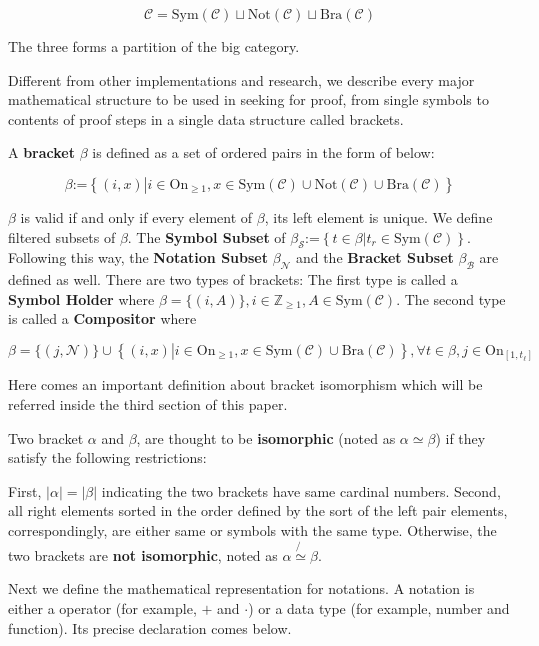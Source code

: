 \documentclass{article}
\begin{document}
\[\mathcal{C}=\text{Sym}(\mathcal{C})\sqcup \text{Not}(\mathcal{C})\sqcup \text{Bra}(\mathcal{C})\]

The three forms a partition of the big category.

Different from other implementations and research, we describe every major mathematical structure to be used in seeking for proof, from single symbols to contents of proof steps in a single data structure called brackets.

 A \textbf{ bracket} \(\beta\) is defined as a set of ordered pairs in the form of below:

\[\beta \text{:=}\left\{(i,x)\left|i\in \text{On}_{\geq 1}\right.,x\in \text{Sym}(\mathcal{C})\cup \text{Not}(\mathcal{C})\cup \text{Bra}(\mathcal{C})\right\}\]

\(\beta\) is valid if and only if every element of \(\beta\), its left element is unique. We define filtered subsets of \(\beta\). The \textbf{ Symbol Subset} of \(\beta _{\mathcal{S}}\text{:=}\left\{t\in \beta \left|t_{\mathit{r}}\in \text{Sym}(\mathcal{C})\right.\right\}\). Following this way, the \textbf{ Notation Subset} \(\beta _{\mathcal{N}}\) and the \textbf{ Bracket Subset} \(\beta _{\mathcal{B}}\) are defined as well. There are two types of brackets: The first type is called a \textbf{ Symbol Holder} where \(\beta =\{(i,A)\},i\in \mathbb{Z}_{\geq 1},A\in \text{Sym}(\mathcal{C})\). The second type is called a \textbf{ Compositor} where

\[\beta =\{(j,\mathcal{N})\}\cup \left\{(i,x)\left|i\in \text{On}_{\geq 1}\right., x\in \text{Sym}(\mathcal{C})\cup \text{Bra}(\mathcal{C})\right\},\forall
t\in \beta ,j\in \text{On}_{\left[1,t_{\ell }\right]}\]

Here comes an important definition about bracket isomorphism which will be referred inside the third section of this paper.

 Two bracket \(\alpha\) and \(\beta\), are thought to be \textbf{ isomorphic} (noted as \(\alpha \simeq \beta\)) if they satisfy the following restrictions:

First, \(|\alpha |=|\beta |\) indicating the two brackets have same cardinal numbers. Second, all right elements sorted in the order defined by the sort of the left pair elements, correspondingly, are either same or symbols with the same type. Otherwise, the two brackets are \textbf{ not isomorphic}, noted as \(\alpha \not{\simeq}\beta\).

Next we define the mathematical representation for notations. A notation is either a operator (for example, \(+\) and \(\cdot\)) or a data type (for example, number and function). Its precise declaration comes below.
\end{document}
